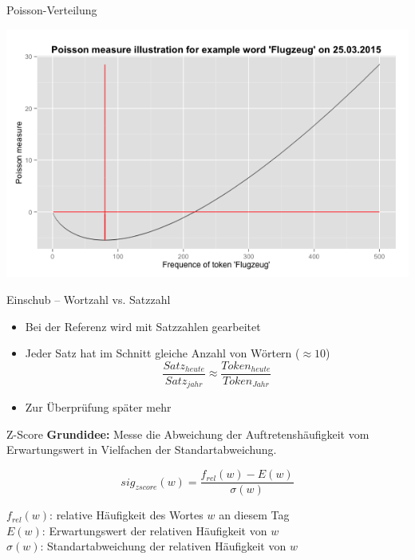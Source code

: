 \documentclass{beamer}
\begin{document}
\begin{frame}{Poisson-Verteilung}
	  \begin{centering}
	  \includegraphics[width=1\textwidth]{pictures/poissonMeasureFlugzeug.png}
	\end{centering}
\end{frame}

\begin{frame}{Einschub – Wortzahl vs. Satzzahl}
	\begin{itemize}
		\item{Bei der Referenz wird mit Satzzahlen gearbeitet}
		
		\item{Jeder Satz hat im Schnitt gleiche Anzahl von W\"ortern ($\approx 10$)\\
			\begin{equation}
				\frac{Satz_{heute}}{Satz_{jahr}} \approx \frac{Token_{heute}}{Token_{Jahr}}
			\end{equation}
			}
		\item{Zur \"Uberpr\"ufung sp\"ater mehr}
	\end{itemize}
\end{frame}


\begin{frame}{Z-Score}
	\textbf{Grundidee:} Messe die Abweichung der Auftretenshäufigkeit vom Erwartungswert in Vielfachen der Standartabweichung.
	
	\begin{definition}[ZScore]
		$$ sig_{zscore}(w) = \frac{f_{rel}(w) - E(w)}{\sigma(w)} $$
	\end{definition}
	
	$f_{rel}(w)$: relative Häufigkeit des Wortes $w$ an diesem Tag \\
	$E(w)$: Erwartungswert der relativen Häufigkeit von $w$ \\
	$\sigma(w)$: Standartabweichung der relativen Häufigkeit von $w$
\end{frame}
\end{document}
